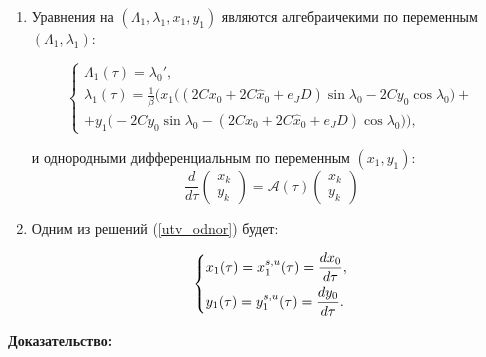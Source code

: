 \begin{utv}
\begin{enumerate}

    \item Уравнения на $(\Lambda_1,\lambda_1,x_1,y_1)$ являются алгебраичекими по переменным $(\Lambda_1,\lambda_1)$:
    
\begin{equation*}
    \begin{cases}
        \Lambda_1(\tau) = \lambda_{0}', \\
        
        \lambda_1(\tau) = \frac1\beta \Big(x_1 \big( (2Cx_0+2C \hat x_0+e_JD) \sin\lambda_0 - 2Cy_0 \cos\lambda_0 \big) + \\
        +y_1 \big( -2Cy_0 \sin\lambda_0 - (2Cx_0+2C \hat x_0+e_JD) \cos\lambda_0 \big) \Big),
    \end{cases}
\end{equation*}

и однородными дифференциальным по переменным $(x_1,y_1)$:
\begin{equation}
\frac{d}{d\tau} \begin{pmatrix} x_k \\ y_k \end{pmatrix} = \mathcal{A}(\tau) \begin{pmatrix} x_k \\ y_k \end{pmatrix}
\label{utv_odnor}
\end{equation}

    \item Одним из решений (\ref{utv_odnor}) будет:
    
\begin{equation}
    \begin{dcases}
        x_1(\tau)=x_1^{s,u}(\tau)=\frac{dx_0}{d \tau}, \\
        y_1(\tau)=y_1^{s,u}(\tau)=\frac{dy_0}{d \tau}. \\
    \end{dcases}
\end{equation}

\end{enumerate}
\end{utv}

\textbf{Доказательство:}\nopagebreak[4]

